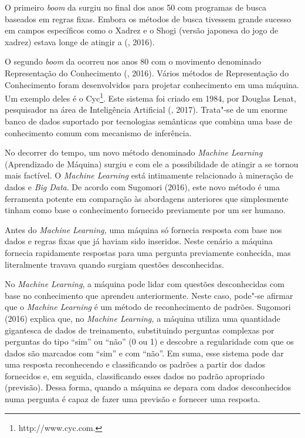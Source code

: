 O primeiro \emph{boom} da  surgiu no final dos anos 50 com programas
de busca baseados em regras fixas. Embora os métodos de busca tivessem
grande sucesso em campos específicos como o Xadrez e o Shogi (versão
japonesa do jogo de xadrez) estava longe de atingir a  (,
2016).

O segundo \emph{boom} da  ocorreu nos anos 80 com o movimento
denominado Representação do Conhecimento (, 2016). Vários
métodos de Representação do Conhecimento foram desenvolvidos para
projetar conhecimento em uma máquina. Um exemplo deles é o Cyc\footnote{http://www.cyc.com.}.
Este sistema foi criado em 1984, por Douglas Lenat, pesquisador na área
de Inteligência Artificial (, 2017). Trata"-se de um enorme banco
de dados suportado por tecnologias semânticas que combina uma base de
conhecimento comum com mecanismo de inferência.

No decorrer do tempo, um novo método denominado \emph{Machine Learning}
(Aprendizado de Máquina) surgiu e com ele a possibilidade de atingir a
 se tornou mais factível. O \emph{Machine Learning} está intimamente
relacionado à mineração de dados e \emph{Big Data}. De acordo com
Sugomori (2016), este novo método é uma ferramenta potente em comparação
às abordagens anteriores que simplesmente tinham como base o
conhecimento fornecido previamente por um ser humano.

Antes do \emph{Machine Learning,} uma máquina só fornecia resposta com
base nos dados e regras fixas que já haviam sido inseridos. Neste
cenário a máquina fornecia rapidamente respostas para uma pergunta
previamente conhecida, mas literalmente travava quando surgiam questões
desconhecidas.

No \emph{Machine Learning}, a máquina pode lidar com questões
desconhecidas com base no conhecimento que aprendeu anteriormente. Neste
caso, pode"-se afirmar que o \emph{Machine Learning} é um método de
reconhecimento de padrões. Sugomori (2016) explica que, no \emph{Machine
Learning,} a máquina utiliza uma quantidade gigantesca de dados de
treinamento, substituindo perguntas complexas por perguntas do tipo
``sim'' ou ``não'' (0 ou 1) e descobre a regularidade com que os dados
são marcados com ``sim'' e com ``não''. Em suma, esse sistema pode dar
uma resposta reconhecendo e classificando os padrões a partir dos dados
fornecidos e, em seguida, classificando esses dados no padrão apropriado
(previsão). Dessa forma, quando a máquina se depara com dados
desconhecidos numa pergunta é capaz de fazer uma previsão e fornecer uma
resposta.

